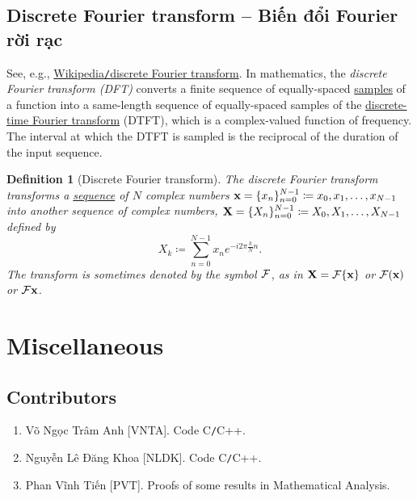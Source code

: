 \documentclass[oneside]{book}
\newtheorem{definition}{Definition}
\begin{document}

\section{Discrete Fourier transform -- Biến đổi Fourier rời rạc}
See, e.g., \href{https://en.wikipedia.org/wiki/Discrete_Fourier_transform}{Wikipedia{\tt/}discrete Fourier transform}. In mathematics, the {\it discrete Fourier transform (DFT)} converts a finite sequence of equally-spaced \href{https://en.wikipedia.org/wiki/Sampling_(signal_processing)}{samples} of a function into a same-length sequence of equally-spaced samples of the \href{https://en.wikipedia.org/wiki/Discrete-time_Fourier_transform}{discrete-time Fourier transform} (DTFT), which is a complex-valued function of frequency. The interval at which the DTFT is sampled is the reciprocal of the duration of the input sequence.

\begin{definition}[Discrete Fourier transform]
	The {\rm discrete Fourier transform} transforms a \href{https://en.wikipedia.org/wiki/Sequence}{sequence} of $N$ complex numbers ${\bf x} = \{x_n\}_{n=0}^{N-1}\coloneqq x_0,x_1,\ldots,x_{N-1}$ into another sequence of complex numbers, ${\bf X} = \{X_n\}_{n=0}^{N-1}\coloneqq X_0,X_1,\ldots,X_{N-1}$ defined by
	\begin{equation}
		\label{discrete Fourier transform}
		\tag{dFt}
		X_k\coloneqq\sum_{n=0}^{N-1} x_ne^{-i2\pi\frac{k}{N}n}.
	\end{equation}
	The transform is sometimes denoted by the symbol ${\cal F}$, as in ${\bf X} = {\cal F}\{{\bf x}\}$ or ${\cal F}({\bf x})$ or ${\cal F}{\bf x}$.
\end{definition}


\chapter{Miscellaneous}
\minitoc


\section{Contributors}

\begin{enumerate}
	\item {\sc Võ Ngọc Trâm Anh [VNTA].} Code C{\tt/}C++.
	\item {\sc Nguyễn Lê Đăng Khoa [NLDK].} Code C{\tt/}C++.
	\item {\sc Phan Vĩnh Tiến [PVT].} Proofs of some results in Mathematical Analysis.
\end{enumerate}
\end{document}
